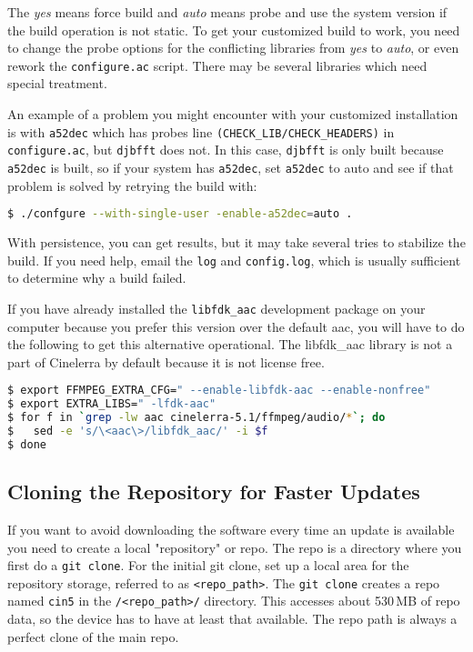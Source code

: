 The \textit{yes} means force build and \textit{auto} means probe and use the system version if the build operation is not static.  
To get your customized build to work, you need to change the probe options for the conflicting libraries from \textit{yes} to \textit{auto}, or even rework the \texttt{configure.ac} script.  
There may be several libraries which need special treatment.

An example of a problem you might encounter with your customized installation is with \texttt{a52dec} which has probes line \texttt{(CHECK\_LIB/CHECK\_HEADERS)} in \texttt{configure.ac}, but \texttt{djbfft} does not.  
In this case, \texttt{djbfft} is only built because \texttt{a52dec} is built, so if your system has \texttt{a52dec}, set \texttt{a52dec} to auto and see if that problem is solved by retrying the build with:  
\begin{lstlisting}[language=bash,numbers=none]
$ ./confgure --with-single-user -enable-a52dec=auto .
\end{lstlisting}

With persistence, you can get results, but it may take several tries to stabilize the build.  
If you need help, email the \texttt{log} and \texttt{config.log}, which is usually sufficient to determine why a build failed.

If you have already installed the \texttt{libfdk\_aac} development package on your computer because you prefer this version over the default aac, you will have to do the following to get this alternative operational. The libfdk\_aac library is not a part of Cinelerra by default because it is not license free.

\begin{lstlisting}[language=bash,numbers=none]
$ export FFMPEG_EXTRA_CFG=" --enable-libfdk-aac --enable-nonfree"
$ export EXTRA_LIBS=" -lfdk-aac"
$ for f in `grep -lw aac cinelerra-5.1/ffmpeg/audio/*`; do
$   sed -e 's/\<aac\>/libfdk_aac/' -i $f
$ done
\end{lstlisting}

\subsection{Cloning the Repository for Faster Updates}%
\label{sub:cloning_the_repository_for_faster_updates}

If you want to avoid downloading the software every time an update is available you need to create a local "repository" or repo.  
The repo is a directory where you first do a \texttt{git clone}.  
For the initial git clone, set up a local area for the repository storage, referred to as \texttt{<repo\_path>}.  
The \texttt{git clone} creates a repo named \texttt{cin5} in the \texttt{/<repo\_path>/} directory.  
This accesses about 530\,MB of repo data, so the device has to have at least that available.  
The repo path is always a perfect clone of the main repo.

